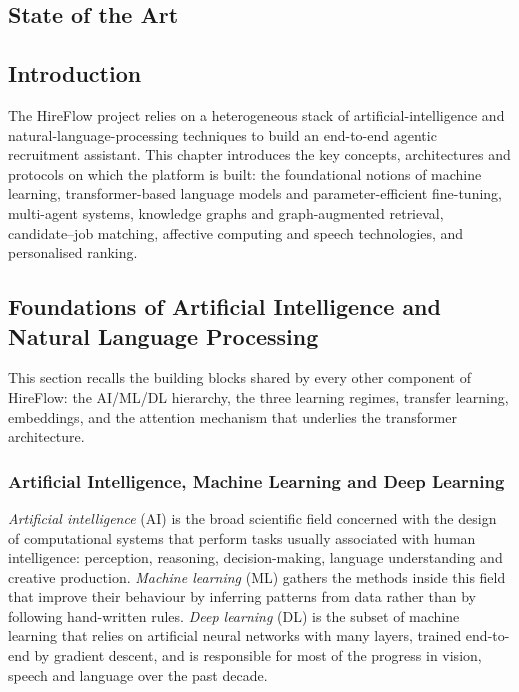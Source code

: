 \begin{center}
    \chapter{State of the Art}
\end{center}
\label{chap:sota}

\section{Introduction}

The HireFlow project relies on a heterogeneous stack of
artificial-intelligence and natural-language-processing techniques to
build an end-to-end agentic recruitment assistant. This chapter
introduces the key concepts, architectures and protocols on which the
platform is built: the foundational notions of machine learning,
transformer-based language models and parameter-efficient fine-tuning,
multi-agent systems, knowledge graphs and graph-augmented retrieval,
candidate--job matching, affective computing and speech technologies,
and personalised ranking.

\section{Foundations of Artificial Intelligence and Natural Language
Processing}

This section recalls the building blocks shared by every other
component of HireFlow: the AI/ML/DL hierarchy, the three learning
regimes, transfer learning, embeddings, and the attention mechanism
that underlies the transformer architecture.

\subsection{Artificial Intelligence, Machine Learning and Deep Learning}
\emph{Artificial intelligence} (AI) is the broad scientific field
concerned with the design of computational systems that perform tasks
usually associated with human intelligence: perception, reasoning,
decision-making, language understanding and creative production.
\emph{Machine learning} (ML) gathers the methods inside this field that
improve their behaviour by inferring patterns from data rather than by
following hand-written rules. \emph{Deep learning} (DL) is the subset
of machine learning that relies on artificial neural networks with many
layers, trained end-to-end by gradient descent, and is responsible for
most of the progress in vision, speech and language over the past
decade.

